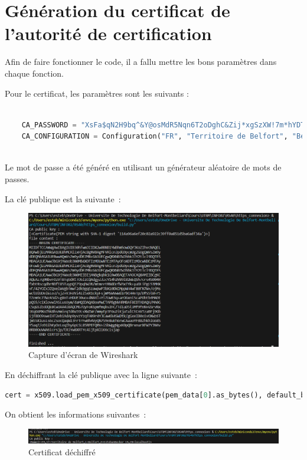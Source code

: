\documentclass[11pt]{article}
\begin{document}
\section{Génération du certificat de l'autorité de certification}

Afin de faire fonctionner le code, il a fallu mettre les bons paramètres dans chaque fonction.

Pour le certificat, les paramètres sont les suivants :

\begin{lstlisting}[language=Python]

    CA_PASSWORD = "XsFa$qN2H9bq^&Y@osMdR5Nqn6T2oDghC&Zij*xgSzXW!7m*hYDToVZukWFKVsaZo9hjSaprUftufpimcSdvhg2k!BwcZp5E4LjGoFEe$QHkLv65ozk*MGee8#BFfsHL"
    CA_CONFIGURATION = Configuration("FR", "Territoire de Belfort", "Belfort", "EstebanBecker_CA", "localhost") 
    
\end{lstlisting}

Le mot de passe a été généré en utilisant un générateur aléatoire de mots de passes.

La clé publique est la suivante :

\begin{figure}[!htb]
    \centering
    \includegraphics[width=\textwidth]{images/Certificat.png}
    \caption{Capture d'écran de Wireshark}
    \label{fig:Certificat}
\end{figure}

En déchiffrant la clé publique avec la ligne suivante :

\begin{lstlisting}[language=Python]
    cert = x509.load_pem_x509_certificate(pem_data[0].as_bytes(), default_backend())
\end{lstlisting}

On obtient les informations suivantes :

\begin{figure}[!htb]
    \centering
    \includegraphics[width=\textwidth]{images/issuer.png}
    \caption{Certificat déchiffré}
    \label{fig:Issuer}
\end{figure}
\end{document}
